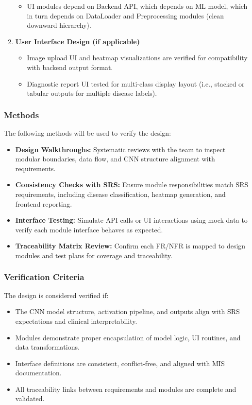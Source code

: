 \documentclass[12pt, titlepage]{article}
\begin{document}
\begin{enumerate}
\begin{itemize}
      \item UI modules depend on Backend API, which depends on ML model, which in turn depends on DataLoader and Preprocessing modules (clean downward hierarchy).
    \end{itemize}
  \item \textbf{User Interface Design (if applicable)}
    \begin{itemize}
      \item Image upload UI and heatmap visualizations are verified for compatibility with backend output format.
      \item Diagnostic report UI tested for multi-class display layout (i.e., stacked or tabular outputs for multiple disease labels).
    \end{itemize}
\end{enumerate}

\subsubsection{Methods}
The following methods will be used to verify the design:
\begin{itemize}
  \item \textbf{Design Walkthroughs:} Systematic reviews with the team to inspect modular boundaries, data flow, and CNN structure alignment with requirements.
  \item \textbf{Consistency Checks with SRS:} Ensure module responsibilities match SRS requirements, including disease classification, heatmap generation, and frontend reporting.
  \item \textbf{Interface Testing:} Simulate API calls or UI interactions using mock data to verify each module interface behaves as expected.
  \item \textbf{Traceability Matrix Review:} Confirm each FR/NFR is mapped to design modules and test plans for coverage and traceability.
\end{itemize}

\subsubsection{Verification Criteria}
The design is considered verified if:
\begin{itemize}
  \item The CNN model structure, activation pipeline, and outputs align with SRS expectations and clinical interpretability.
  \item Modules demonstrate proper encapsulation of model logic, UI routines, and data transformations.
  \item Interface definitions are consistent, conflict-free, and aligned with MIS documentation.
  \item All traceability links between requirements and modules are complete and validated.
\end{itemize}
\end{document}
